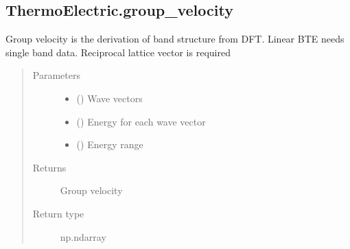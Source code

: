 \documentclass[letterpaper,10pt,english]{sphinxmanual}
\begin{document}
\subsection{ThermoElectric.group\_velocity}
\label{\detokenize{autosummary/ThermoElectric.group_velocity:thermoelectric-group-velocity}}\label{\detokenize{autosummary/ThermoElectric.group_velocity::doc}}

\begin{fulllineitems}
\label{\detokenize{autosummary/ThermoElectric.group_velocity:ThermoElectric.group_velocity}}
\sphinxAtStartPar
Group velocity is the derivation of band structure from DFT. Linear BTE needs single band data.
Reciprocal lattice vector is required
\begin{quote}\begin{description}
\item[{Parameters}] \leavevmode\begin{itemize}
\item {} 
\sphinxAtStartPar
{} () \textendash{} Wave vectors

\item {} 
\sphinxAtStartPar
{} () \textendash{} Energy for each wave vector

\item {} 
\sphinxAtStartPar
{} () \textendash{} Energy range

\end{itemize}

\item[{Returns}] \leavevmode
\sphinxAtStartPar
{} \textendash{} Group velocity

\item[{Return type}] \leavevmode
\sphinxAtStartPar
np.ndarray

\end{description}\end{quote}

\end{fulllineitems}
\end{document}
